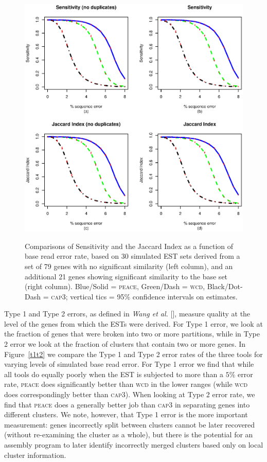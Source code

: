 \documentclass[a4paper,12pt]{article}
\begin{document}
\begin{appendix}
\begin{figure}[tbp]
\centerline{
\includegraphics[scale=0.5]{4JiSe.eps}
\label{JiSe}
}
\caption{Comparisons of Sensitivity and the Jaccard Index as a
  function of base read error rate, based on 30 simulated EST sets
  derived from a set of 79 genes with no significant similarity (left
  column), and an additional 21 genes showing significant similarity
  to the base set (right column).  Blue/Solid = \textsc{peace}, Green/Dash =
  \textsc{wcd}, Black/Dot-Dash = \textsc{cap3}; vertical tics = 95\% confidence
  intervals on estimates.}
\end{figure}

Type 1 and Type 2 errors, as defined in {\it Wang et al.}
[\cite{Wang04}], measure quality at the level of the genes from which
the ESTs were derived.  For Type 1 error, we look at the fraction of genes
that were  broken into two or more partitions, while in
Type 2 error we look at the fraction of clusters that contain two or
more genes.   In Figure~\ref{t1t2} we compare the Type 1 and Type 2 error rates of
the three tools for varying levels of simulated base read error.  For
Type 1 error we find that while all tools do equally poorly when the
EST is subjected to more than a $5\%$ error rate, \textsc{peace} does
significantly better than \textsc{wcd} in the lower ranges (while
\textsc{wcd} does correspondingly better than \textsc{cap3}).  When
looking at Type 2 error rate, we find that \textsc{peace} does a
generally better job than \textsc{cap3} in separating genes into
different clusters.  We note, however, that Type 1 error is the more
important measurement: genes incorrectly split between clusters cannot
be later recovered (without re-examining the cluster as a whole), but
there is the potential for an assembly program to later identify
incorrectly merged clusters based only on local cluster information.



\end{appendix}
\end{document}
